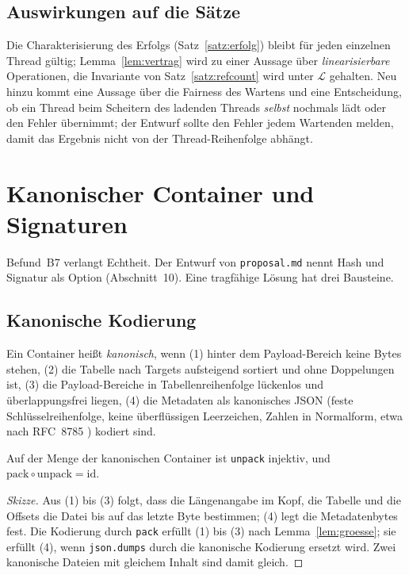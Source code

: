 \subsection{Auswirkungen auf die Sätze}

Die Charakterisierung des Erfolgs (Satz~\ref{satz:erfolg}) bleibt für jeden einzelnen Thread gültig; Lemma~\ref{lem:vertrag} wird zu einer Aussage über \emph{linearisierbare} Operationen, die Invariante von Satz~\ref{satz:refcount} wird unter $\mathcal{L}$ gehalten. Neu hinzu kommt eine Aussage über die Fairness des Wartens und eine Entscheidung, ob ein Thread beim Scheitern des ladenden Threads \emph{selbst} nochmals lädt oder den Fehler übernimmt; der Entwurf sollte den Fehler jedem Wartenden melden, damit das Ergebnis nicht von der Thread-Reihenfolge abhängt.

\section{Kanonischer Container und Signaturen}
\label{sec:signatur-ausblick}

Befund~B7 verlangt Echtheit. Der Entwurf von \texttt{proposal.md} nennt Hash und Signatur als Option (Abschnitt~10). Eine tragfähige Lösung hat drei Bausteine.

\subsection{Kanonische Kodierung}

\begin{definition}
	Ein Container heißt \emph{kanonisch}, wenn (1) hinter dem Payload-Bereich keine Bytes stehen, (2) die Tabelle nach Targets aufsteigend sortiert und ohne Doppelungen ist, (3) die Payload-Bereiche in Tabellenreihenfolge lückenlos und überlappungsfrei liegen, (4) die Metadaten als kanonisches JSON (feste Schlüsselreihenfolge, keine überflüssigen Leerzeichen, Zahlen in Normalform, etwa nach RFC~8785 \cite{rfc8785}) kodiert sind.
\end{definition}

\begin{satz}
	Auf der Menge der kanonischen Container ist \texttt{unpack} injektiv, und $\mathrm{pack}\circ\mathrm{unpack}=\mathrm{id}$.
\end{satz}

\begin{proof}[Skizze]
	Aus (1) bis (3) folgt, dass die Längenangabe im Kopf, die Tabelle und die Offsets die Datei bis auf das letzte Byte bestimmen; (4) legt die Metadatenbytes fest. Die Kodierung durch \texttt{pack} erfüllt (1) bis (3) nach Lemma~\ref{lem:groesse}; sie erfüllt (4), wenn \texttt{json.dumps} durch die kanonische Kodierung ersetzt wird. Zwei kanonische Dateien mit gleichem Inhalt sind damit gleich.
\end{proof}

